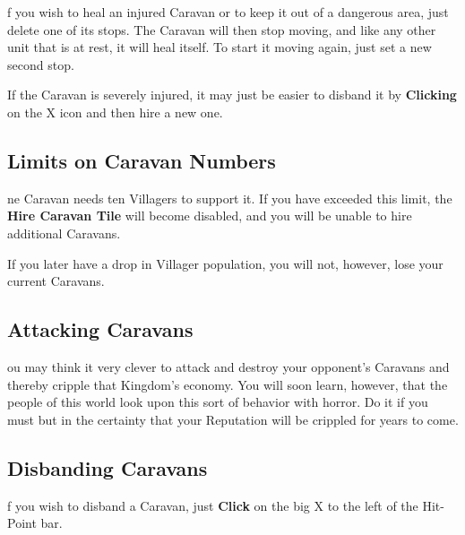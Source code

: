 
f you wish to heal an injured Caravan or to keep it out of a dangerous area, just delete one of its stops. The Caravan will then stop moving, and like any other unit that is at rest, it will heal itself. To start it moving again, just set a new second stop.


If the Caravan is severely injured, it may just be easier to disband it by \textbf{Clicking} on the X icon and then hire a new one.

\subsection{\textsf{Limits on Caravan Numbers}}


ne Caravan needs ten Villagers to support it. If you have exceeded this limit, the \textbf{Hire Caravan Tile} will become disabled, and you will be unable to hire additional Caravans.

If you later have a drop in Villager population, you will not, however, lose your current Caravans.

\subsection{\textsf{Attacking Caravans}}


ou may think it very clever to attack and destroy your opponent’s Caravans and thereby cripple that Kingdom's economy. You will soon learn, however, that the people of this world look upon this sort of behavior with horror. Do it if you must but in the certainty that your Reputation will be crippled for years to come.

\subsection{\textsf{Disbanding Caravans}}



f you wish to disband a Caravan, just \textbf{Click} on the big X to the left of the Hit-Point bar.

